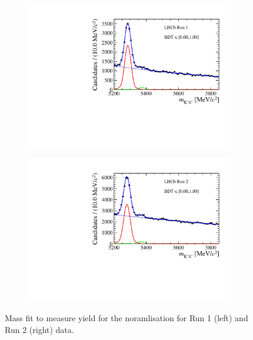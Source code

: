 \begin{figure}[htbp]
    \centering
  \begin{subfigure}[b]{0.4\textwidth}
        \includegraphics[width=  \textwidth]{./Figs/BFAnalysis/Bd2KPi_mass_RunI_BDTbinNone.pdf}
    \end{subfigure}
    \begin{subfigure}[b]{0.4\textwidth}
       \includegraphics[width=\textwidth]{./Figs/BFAnalysis/Bd2KPi_mass_RunII_BDTbinNone.pdf}
   \end{subfigure}
    \caption{Mass fit to measure \bdkpi yield for the noramlisation for Run 1 (left) and Run 2 (right) data. }
    \label{fig:Bdkpiyield}
\end{figure}



